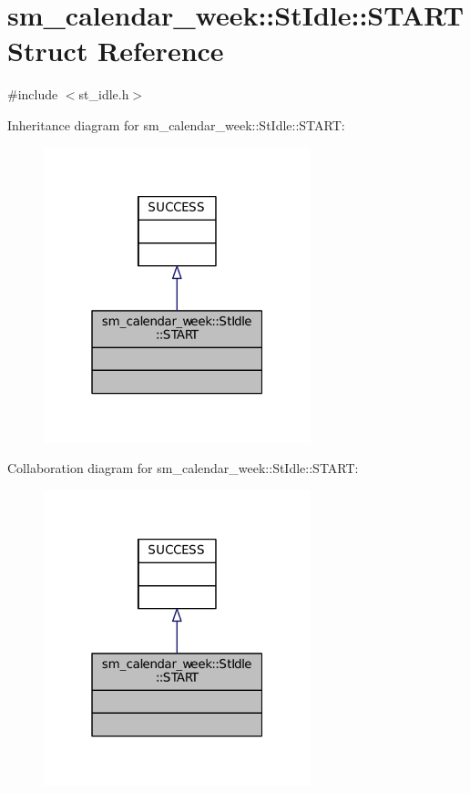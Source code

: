 \hypertarget{structsm__calendar__week_1_1StIdle_1_1START}{}\section{sm\+\_\+calendar\+\_\+week\+:\+:St\+Idle\+:\+:S\+T\+A\+RT Struct Reference}
\label{structsm__calendar__week_1_1StIdle_1_1START}


{\ttfamily \#include $<$st\+\_\+idle.\+h$>$}



Inheritance diagram for sm\+\_\+calendar\+\_\+week\+:\+:St\+Idle\+:\+:S\+T\+A\+RT\+:
\nopagebreak
\begin{figure}[H]
\begin{center}
\leavevmode
\includegraphics[width=220pt]{structsm__calendar__week_1_1StIdle_1_1START__inherit__graph}
\end{center}
\end{figure}


Collaboration diagram for sm\+\_\+calendar\+\_\+week\+:\+:St\+Idle\+:\+:S\+T\+A\+RT\+:
\nopagebreak
\begin{figure}[H]
\begin{center}
\leavevmode
\includegraphics[width=220pt]{structsm__calendar__week_1_1StIdle_1_1START__coll__graph}
\end{center}
\end{figure}


